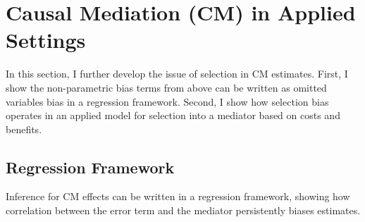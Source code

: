 \section{Causal Mediation (CM) in Applied Settings}
\label{sec:applied}
In this section, I further develop the issue of selection in CM estimates. First, I show the non-parametric bias terms from above can be written as omitted variables bias in a regression framework.
Second, I show how selection bias operates in an applied model for selection into a mediator based on costs and benefits.

\subsection{Regression Framework}
\label{sec:regression}
Inference for CM effects can be written in a regression framework, showing how correlation between the error term and the mediator persistently biases estimates.


